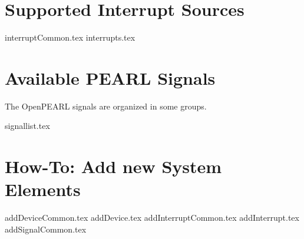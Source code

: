 \documentclass[10pt]{scrbook}
\begin{document}
\chapter{Supported Interrupt Sources}
{interruptCommon.tex}
{interrupts.tex}

\chapter{Available PEARL Signals}
The OpenPEARL signals are organized in some groups.

{signallist.tex}


\chapter{How-To: Add new System Elements}
{addDeviceCommon.tex}
{addDevice.tex}
{addInterruptCommon.tex}
{addInterrupt.tex}
{addSignalCommon.tex}
\end{document}
